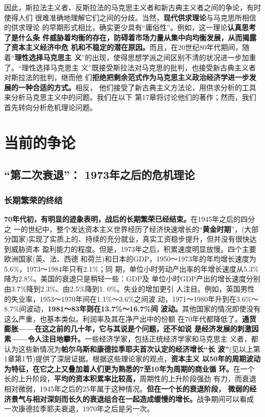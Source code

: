 因此，斯拉法主义者、反斯拉法的马克思主义者和新古典主义者之间的争论，有时使得人们
很难准确地理解它们之间的分歧。当然，\textbf{现代供求理论}与马克思所相信的供求理论
的早期形式相比，确实更少具有“庸俗性”。例如，这一理论\textbf{认真思考了是什么条
  件威胁着均衡的存在，防碍着市场力量从集中向均衡发展，从而揭露了资本主义经济中危
  机和不稳定的潜在原因。}而且，在20世纪80年代期间，随着“\textbf{理性选择马克思主
  义}”的出现，使得思想学派之间区别不清的状况进一步加重了。“理性选择马克思主
义”既接受斯拉法对马克思的批判，也接受新古典主义者对斯拉法的批判，继而他
们\textbf{拒绝把剩余范式作为马克思主义政治经济学进一步发展的一种合适的方式。}相反，
他们接受了新古典主义方法论，用供求分析的工具来分析马克思主义中的问题。我们在以下
第17章将讨论他们的著作；然而，我们首先转向分析危机理论问题。

\part{当前的争论}

\chapter{“第二次衰退”： 1973年之后的危机理论}

\section{长期繁荣的终结}

\textbf{70年代初，有明显的迹象表明，战后的长期繁荣已经结束。}在1945年之后的四分之
一的世纪中，整个发达资本主义世界经历了经济快速增长的“\textbf{黄金时期}”，(大部
分国家)实现了实质上的、持续的充分就业，真实工资稳步提升，但并没有很快达到威胁资本
盈利能力的程度。但是，1973年之后，积累速度明显放慢。四个主要欧洲国家(英、法、西德
和荷兰)和日本的GDP，1950～1973年的年均增长速度为5.6\%，1973～1984年只有2.1\%；同
期，单位小时劳动产出率的年增长速度从5.3\%降为2.8\%。美国的衰退只是稍轻一些：GDP及
单位小时GDP产出的增长速度分别由3.7\%降到2.3\%、由2.5\%降到1. 0\%。失业的增加更引
人注目。例如，英国男性的失业率，1953～1970年间在1.1\%～3.6\%之间波
动，1971～1980年升到在3.6\%～8.7\%间波动，\textbf{1981～83年则在13.7\%～16.7\%间
  波动。}其他国家的情况即使没有这么严重，也基本类似。利润率及其在净产出中的份额
在70年代都降低了。\textbf{通货膨胀——在这之前的几十年，它与其说是个问题，还不如说
  是经济发展的刺激因素——令人注目地攀升。}一些经济学家，包括正统经济学家和马克思主
义者，都认为这些新情况为\textbf{帕尔乌斯和康德拉季耶夫首次认定的经济增长“长
  波”}(见以上第1章第1节)提供了深层证据。根据这些理论家的观点，\textbf{资本主义
  以50年的周期波动为特征，在它之上又叠加着人们更为熟悉的7至10年为周期的商业循
  环。}在一个长的上升阶段，\textbf{平均的资本积累率比较高，}周期性的上升阶段强劲
有力，而衰退相对微弱，1945年之后的25年属于这种情况。\textbf{但在一个长的衰退阶段，
  微弱的经济景气与相对深刻而长久的衰退组合在一起造成缓慢的增长。}战争期间可以看成
一次康德拉季耶夫衰退，1970年之后是另一次。

